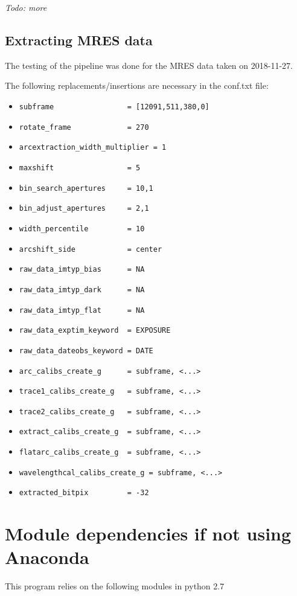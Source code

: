 \documentclass[10pt,a4paper]{article}
\begin{document}
\textit{Todo: more}

\subsection{Extracting MRES data}

The testing of the pipeline was done for the MRES data taken on 2018-11-27.

\noindent The following replacements/insertions are necessary in the conf.txt file:
\begin{itemize}\setlength\itemsep{0em}
\small
  \item \verb|subframe                 = [12091,511,380,0]|
  \item \verb|rotate_frame             = 270|
  \item \verb|arcextraction_width_multiplier = 1|
  \item \verb|maxshift                 = 5|
  \item \verb|bin_search_apertures     = 10,1|
  \item \verb|bin_adjust_apertures     = 2,1|
  \item \verb|width_percentile         = 10|
  \item \verb|arcshift_side            = center|
  \item \verb|raw_data_imtyp_bias      = NA|
  \item \verb|raw_data_imtyp_dark      = NA|
  \item \verb|raw_data_imtyp_flat      = NA|
  \item \verb|raw_data_exptim_keyword  = EXPOSURE|
  \item \verb|raw_data_dateobs_keyword = DATE|
  \item \verb|arc_calibs_create_g      = subframe, <...>|
  \item \verb|trace1_calibs_create_g   = subframe, <...>|
  \item \verb|trace2_calibs_create_g   = subframe, <...>|
  \item \verb|extract_calibs_create_g  = subframe, <...>|
  \item \verb|flatarc_calibs_create_g  = subframe, <...>|
  \item \verb|wavelengthcal_calibs_create_g = subframe, <...>|
  \item \verb|extracted_bitpix         = -32|
\end{itemize}

\newpage

\appendix

\section{Module dependencies if not using Anaconda}
\label{section:module_dependency}
\noindent This program relies on the following modules in python 2.7
\end{document}
